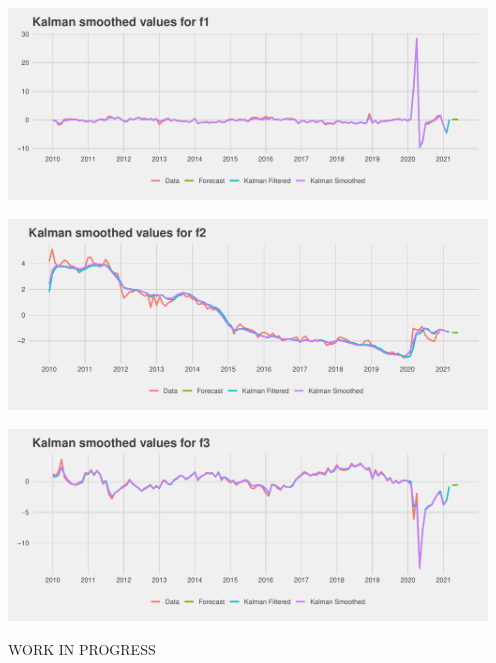 \documentclass[11pt, letterpaper]{article}\usepackage[]{graphicx}\usepackage[]{color}
\begin{document}
{\centering \includegraphics[width=5in,height=2in]{figure/unnamed-chunk-15-1} 

}




{\centering \includegraphics[width=5in,height=2in]{figure/unnamed-chunk-15-2} 

}




{\centering \includegraphics[width=5in,height=2in]{figure/unnamed-chunk-15-3} 

}





WORK IN PROGRESS
\end{document}
